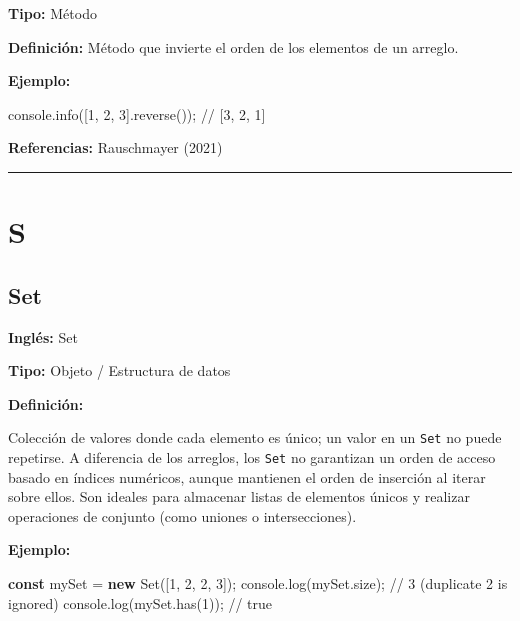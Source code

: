 \documentclass[
  letterpaper,
  DIV=11,
  numbers=noendperiod]{scrreprt}
\newenvironment{Shaded}{\begin{snugshade}}{\end{snugshade}}
\newcommand{\AttributeTok}[1]{\textcolor[rgb]{0.40,0.45,0.13}{#1}}
\newcommand{\BuiltInTok}[1]{\textcolor[rgb]{0.00,0.23,0.31}{#1}}
\newcommand{\CommentTok}[1]{\textcolor[rgb]{0.37,0.37,0.37}{#1}}
\newcommand{\DecValTok}[1]{\textcolor[rgb]{0.68,0.00,0.00}{#1}}
\newcommand{\FunctionTok}[1]{\textcolor[rgb]{0.28,0.35,0.67}{#1}}
\newcommand{\KeywordTok}[1]{\textcolor[rgb]{0.00,0.23,0.31}{\textbf{#1}}}
\newcommand{\NormalTok}[1]{\textcolor[rgb]{0.00,0.23,0.31}{#1}}
\newcommand{\OperatorTok}[1]{\textcolor[rgb]{0.37,0.37,0.37}{#1}}
\let\oldsubsection\subsection
\renewcommand{\subsection}{\phantomsection\oldsubsection}
\begin{document}
\textbf{Tipo:} Método

\textbf{Definición:} Método que invierte el orden de los elementos de un
arreglo.

\textbf{Ejemplo:}

\begin{Shaded}
\begin{Highlighting}[]
\BuiltInTok{console}\OperatorTok{.}\FunctionTok{info}\NormalTok{([}\DecValTok{1}\OperatorTok{,} \DecValTok{2}\OperatorTok{,} \DecValTok{3}\NormalTok{]}\OperatorTok{.}\FunctionTok{reverse}\NormalTok{())}\OperatorTok{;} \CommentTok{// [3, 2, 1]}
\end{Highlighting}
\end{Shaded}

\textbf{Referencias:} Rauschmayer (2021)

\begin{center}\rule{0.5\linewidth}{0.5pt}\end{center}

\section*{S}\label{s}


\subsection*{Set}\label{glos-set}

\textbf{Inglés:} Set

\textbf{Tipo:} Objeto / Estructura de datos

\textbf{Definición:}

Colección de valores donde cada elemento es único; un valor en un
\texttt{Set} no puede repetirse. A diferencia de los arreglos, los
\texttt{Set} no garantizan un orden de acceso basado en índices
numéricos, aunque mantienen el orden de inserción al iterar sobre ellos.
Son ideales para almacenar listas de elementos únicos y realizar
operaciones de conjunto (como uniones o intersecciones).

\textbf{Ejemplo:}

\begin{Shaded}
\begin{Highlighting}[]
\KeywordTok{const}\NormalTok{ mySet }\OperatorTok{=} \KeywordTok{new} \BuiltInTok{Set}\NormalTok{([}\DecValTok{1}\OperatorTok{,} \DecValTok{2}\OperatorTok{,} \DecValTok{2}\OperatorTok{,} \DecValTok{3}\NormalTok{])}\OperatorTok{;}
\BuiltInTok{console}\OperatorTok{.}\FunctionTok{log}\NormalTok{(mySet}\OperatorTok{.}\AttributeTok{size}\NormalTok{)}\OperatorTok{;} \CommentTok{// 3 (duplicate 2 is ignored)}
\BuiltInTok{console}\OperatorTok{.}\FunctionTok{log}\NormalTok{(mySet}\OperatorTok{.}\FunctionTok{has}\NormalTok{(}\DecValTok{1}\NormalTok{))}\OperatorTok{;} \CommentTok{// true}
\end{Highlighting}
\end{Shaded}
\end{document}
